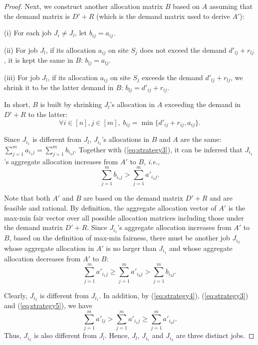 \begin{proof}
Next, we construct another allocation matrix $B$ based on $A$ assuming that the demand matrix is $D'+R$ (which is the demand matrix used to derive $A'$): 

(i) For each job $J_i \neq J_l$, let $b_{ij} = a_{ij}$.

(ii) For job $J_l$, if its allocation $a_{ij}$ on site $S_j$ does not exceed the demand $d'_{lj}+r_{lj}$, it is kept the same in $B$: $b_{lj} = a_{lj}$.

(iii) For job $J_l$, if its allocation $a_{ij}$ on site $S_j$ exceeds the demand $d'_{lj} +r_{lj}$, we shrink it to be the latter demand in $B$: $b_{lj} = d'_{ij} +r_{ij}$.

In short, $B$ is built by shrinking $J_l$'s allocation in $A$ exceeding the demand in $D'+R$ to the latter:
$$
\forall i \in [n], j \in [m], \; b_{ij} = \min\{d'_{ij}+r_{ij}, a_{ij}\}.
$$

Since $J_{i_1}$ is different from $J_l$,  $J_{i_1}$'s allocations in $B$ and $A$ are the same: $\sum_{j=1}^m a_{i_1j} =\sum_{j=1}^m b_{i_1j}$. Together with (\ref{eq:strategy3}), it can be inferred that $J_{i_1}$'s aggregate allocation increases from $A'$ to $B$, \textit{i.e.}, 
\begin{equation}
\sum_{j=1}^m b_{i_1j} > \sum_{j=1}^m a'_{i_1j}.
\label{eq:strategy8}
\end{equation}

Note that both $A'$ and $B$ are based on the demand matrix $D' + R$ and are feasible and rational. By definition, the aggregate allocation vector of $A'$ is the max-min fair vector over all possible allocation matrices including those under the demand matrix $D' + R$. Since $J_{i_1}$'s aggregate allocation increases from $A'$ to $B$, based on the definition of max-min fairness, there must be another job $J_{i_2}$ whose aggregate allocation in $A'$ is no larger than $J_{i_1}$ and whose aggregate allocation decreases from $A'$ to $B$:
\begin{equation}
\sum_{j=1}^m a'_{i_1 j} \geq \sum_{j=1}^m a'_{i_2 j} > \sum_{j=1}^m b_{i_2 j}.
\label{eq:strategy5}
\end{equation}

Clearly, $J_{i_2}$ is different from $J_{i_1}$. In addition, by (\ref{eq:strategy4}), (\ref{eq:strategy3}) and (\ref{eq:strategy5}), we have
\begin{equation}
\sum_{j=1}^m a'_{l j} > \sum_{j=1}^m a'_{i_1 j} \geq \sum_{j=1}^m a'_{i_2 j}.
\label{eq:strategy0}
\end{equation}
Thus, $J_{i_2}$ is also different from $J_l$. Hence, $J_l$, $J_{i_1}$ and $J_{i_2}$ are three distinct jobs.


\end{proof}
